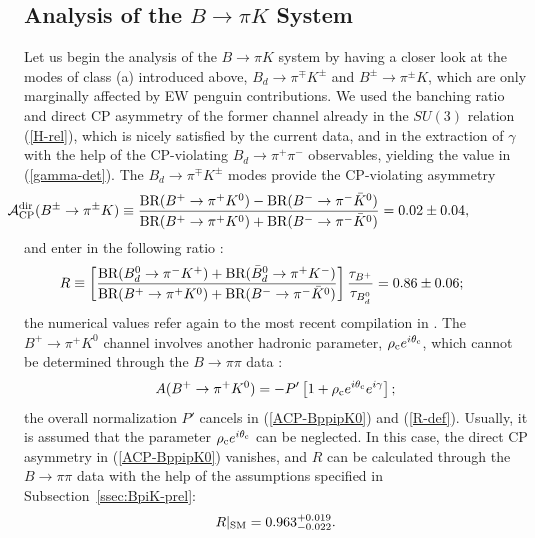 \documentclass[11pt]{cernrep}
\begin{document}
%
%
%
\boldmath
\subsection{Analysis of the $B\to\pi K$ System}\label{ssec:BpiK}
\unboldmath
%
%
%
Let us begin the analysis of the $B\to\pi K$ system by having a closer
look at the modes of class (a) introduced above, $B_d\to\pi^\mp K^\pm$
and $B^\pm\to\pi^\pm K$, which are only marginally affected by
EW penguin contributions. We used the banching ratio and direct 
CP asymmetry of the former channel already in the $SU(3)$ relation (\ref{H-rel}),
which is nicely satisfied by the current data, and in the extraction of
$\gamma$ with the help of the CP-violating $B_d\to\pi^+\pi^-$ observables,
yielding the value in  (\ref{gamma-det}). The $B_d\to\pi^\mp K^\pm$
modes provide the CP-violating asymmetry
\begin{equation}\label{ACP-BppipK0}
\hspace*{-1.9truecm}{\cal A}_{\rm CP}^{\rm dir}(B^\pm\to\pi^\pm K)\equiv
\frac{\mbox{BR}(B^+\to\pi^+K^0)-
\mbox{BR}(B^-\to\pi^-\bar K^0)}{\mbox{BR}(B^+\to\pi^+K^0)+
\mbox{BR}(B^-\to\pi^-\bar K^0)} =%
0.02 \pm 0.04,
\end{equation}
and enter in the following ratio \cite{FM}:
\begin{equation}\label{R-def}
\hspace*{-0.7truecm}R\equiv\left[\frac{\mbox{BR}(B_d^0\to\pi^- K^+)+
\mbox{BR}(\bar B_d^0\to\pi^+ K^-)}{\mbox{BR}(B^+\to\pi^+ K^0)+
\mbox{BR}(B^-\to\pi^- \bar K^0)}
\right]\frac{\tau_{B^+}}{\tau_{B^0_d}} =%
0.86\pm0.06;
\end{equation}
the numerical values refer again to the most recent compilation in \cite{HFAG}. 
The $B^+\to\pi^+ K^0$ channel involves another hadronic parameter,
$\rho_{\rm c}e^{i\theta_{\rm c}}$, which cannot be determined through
the $B\to\pi\pi$ data \cite{BF98,defan,neubert}:
\begin{equation}\label{B+pi+K0}
A(B^+\to\pi^+K^0)=-P'\left[1+\rho_{\rm c}e^{i\theta_{\rm c}}e^{i\gamma}
\right];
\end{equation}
the overall normalization $P'$ cancels in (\ref{ACP-BppipK0}) and
(\ref{R-def}). Usually, it is assumed that the parameter $\rho_{\rm c}e^{i\theta_{\rm c}}$  
can be neglected. In this case, the direct CP asymmetry in (\ref{ACP-BppipK0}) 
vanishes, and $R$ can be calculated through the $B\to\pi\pi$ data with the help 
of the assumptions specified in Subsection~\ref{ssec:BpiK-prel}:
\begin{equation}\label{R-pred-0}
R|_{\rm SM}=0.963^{+0.019}_{-0.022}.
\end{equation}
\end{document}
